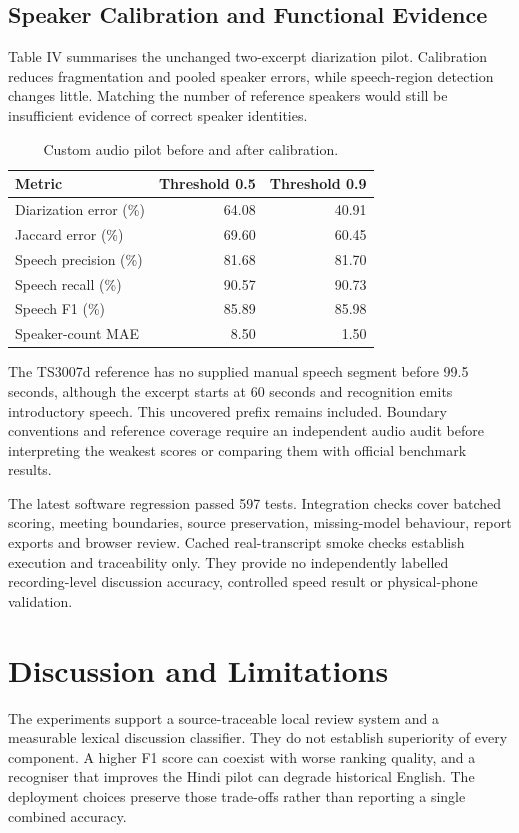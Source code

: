 \documentclass[conference,a4paper]{IEEEtran}
\begin{document}
\subsection{Speaker Calibration and Functional Evidence}
Table IV summarises the unchanged two-excerpt diarization pilot. Calibration reduces fragmentation and pooled speaker errors, while speech-region detection changes little. Matching the number of reference speakers would still be insufficient evidence of correct speaker identities.

\begin{table}[t]
\caption{Custom audio pilot before and after calibration.}
\centering\footnotesize
\setlength{\tabcolsep}{2pt}
\begin{tabular}{p{}rr}
\toprule
Metric & Threshold 0.5 & Threshold 0.9 \\
\midrule
Diarization error (\%) & 64.08 & 40.91 \\
Jaccard error (\%) & 69.60 & 60.45 \\
Speech precision (\%) & 81.68 & 81.70 \\
Speech recall (\%) & 90.57 & 90.73 \\
Speech F1 (\%) & 85.89 & 85.98 \\
Speaker-count MAE & 8.50 & 1.50 \\
\bottomrule
\end{tabular}
\end{table}
The TS3007d reference has no supplied manual speech segment before 99.5 seconds, although the excerpt starts at 60 seconds and recognition emits introductory speech. This uncovered prefix remains included. Boundary conventions and reference coverage require an independent audio audit before interpreting the weakest scores or comparing them with official benchmark results.

The latest software regression passed 597 tests. Integration checks cover batched scoring, meeting boundaries, source preservation, missing-model behaviour, report exports and browser review. Cached real-transcript smoke checks establish execution and traceability only. They provide no independently labelled recording-level discussion accuracy, controlled speed result or physical-phone validation.

\balance
\section{Discussion and Limitations}
The experiments support a source-traceable local review system and a measurable lexical discussion classifier. They do not establish superiority of every component. A higher F1 score can coexist with worse ranking quality, and a recogniser that improves the Hindi pilot can degrade historical English. The deployment choices preserve those trade-offs rather than reporting a single combined accuracy.
\end{document}
